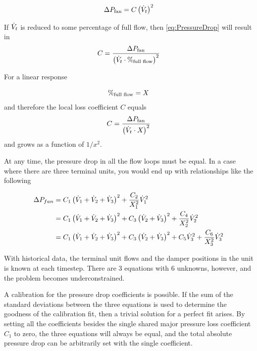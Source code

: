 \begin{equation}\label{eq:PressureDrop}
    \Delta P_{\text{fan}} = C\left(\dot{V}_{t}\right)^2
\end{equation}

If \(\dot{V}_{t}\) is reduced to some percentage of full flow, then
 \ref{eq:PressureDrop} will result in
 \begin{equation}
     C = \frac{\Delta P_{\text{fan}}}{\left( \dot{V}_{t} \cdot \%_{\text{full flow}} \right)^2}
 \end{equation}

For a linear response

\begin{equation}
    \%_{\text{full flow}} = X_{}
\end{equation}
and therefore the local loss coefficient \(C\) equals
\begin{equation}
C = \frac{\Delta P_{\text{fan}}}{\left( \dot{V}_{t} \cdot X_{}  \right)^2}
\end{equation}
and grows as a function of \(1/x^2\).

At any time, the pressure drop in all the flow loops must be equal. In a
case where there are three terminal units, you would end up with
relationships like the following

\begin{align}
    \Delta P_{fan}  &= C_1 \left(\dot{V}_{1}+\dot{V}_{2}+\dot{V}_{3} \right)^2 + \frac{C_2}{X_{1}^2}\dot{V}_{1}^2 \\
                    &= C_1 \left(\dot{V}_{1}+\dot{V}_{2}+\dot{V}_{3} \right)^2 + C_3\left(\dot{V}_{2}+\dot{V}_{3} \right)^2 + \frac{C_4}{X_{2}^2}\dot{V}_{2}^2 \\
                    &= C_1 \left(\dot{V}_{1}+\dot{V}_{2}+\dot{V}_{3} \right)^2 + C_3\left(\dot{V}_{2}+\dot{V}_{3} \right)^2 + C_5\dot{V}_{3}^2 + \frac{C_6}{X_{3}^2}\dot{V}_{3}^2
\end{align}

With historical data, the terminal unit flows and the
damper positions in the unit is known at each timestep. There are 3 equations with 6
unknowns, however, and the problem becomes underconstrained.

A calibration for the pressure drop coefficients is possible. If the sum
of the standard deviations between the three equations is used to
determine the goodness of the calibration fit, then a trivial solution
for a perfect fit arises. By setting all the coefficients besides the
single shared major pressure loss coefficient \(C_1\) to zero, the three
equations will always be equal, and the total absolute pressure drop can
be arbitrarily set with the single coefficient.

